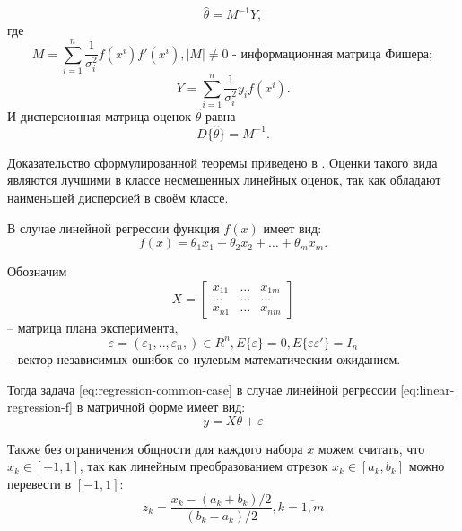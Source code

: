 \begin{theorem}
	\begin{equation}
	\hat{\theta} = M^{-1} Y,
	\end{equation}
	где 
	$$M = \sum_{i=1}^{n} \frac{1}{\sigma_i^2}f(x^{i})f'(x^{i}), |M| \ne 0 \text{ - информационная матрица Фишера};$$
	$$Y = \sum_{i=1}^{n}\frac{1}{\sigma_i^2} y_i f(x^{i}).$$
	И дисперсионная матрица оценок $\hat \theta$ равна
	\begin{equation}
		D\{ \hat \theta \} = M^{-1}.
	\end{equation}
\end{theorem}
Доказательство сформулированной теоремы приведено в \cite{fedorov}. Оценки такого вида являются лучшими в классе несмещенных линейных оценок, так как обладают наименьшей дисперсией в своём классе. 


В случае линейной регрессии функция $f(x)$ имеет вид:
\begin{equation}\label{eq:linear-regression-f}
f(x) = \theta_1 x_1 + \theta_2 x_2 + \dots + \theta_m x_m.
\end{equation}
  
Обозначим
\begin{equation}
X = 
\begin{bmatrix}
x_{11}	&	\dots	&	x_{1m}\\
\dots	&	\dots	&	\dots\\
x_{n1}	&	\dots	&	x_{nm}
\end{bmatrix}
\end{equation} 
-- матрица плана эксперимента, \\
\begin{equation}
\varepsilon = (\varepsilon_1,.., \varepsilon_n,) \in R^n, E\{\varepsilon\} = 0, E\{\varepsilon \varepsilon'\}=I_n
\end{equation}
-- вектор независимых ошибок со нулевым математическим ожиданием.

Тогда задача \eqref{eq:regression-common-case} в случае линейной регрессии \eqref{eq:linear-regression-f} в матричной форме имеет вид:
\begin{equation}
y = X \theta + \varepsilon
\end{equation}

Также без ограничения общности для каждого набора $x$ можем считать, что  $x_k \in [-1, 1]$, так как линейным преобразованием отрезок $x_k \in [a_k, b_k]$ можно перевести в $[-1, 1]$:
$$z_k = \frac{x_k - (a_k + b_k)/2}{(b_k - a_k)/2}, k = \overline{1, m}$$ 

